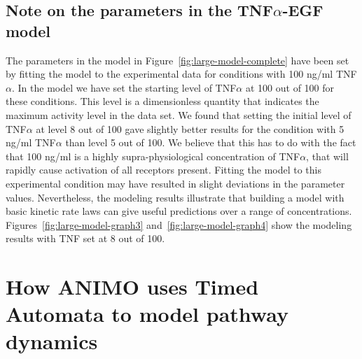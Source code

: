 \subsection{Note on the parameters in the TNF$\alpha$-EGF model}\label{suppl:parameters-tnf-egf}
The parameters in the model in Figure~\ref{fig:large-model-complete}
have been set by fitting the model to the experimental data for conditions with 100 ng/ml TNF$\alpha$.
In the model we have set the starting level of TNF$\alpha$ at 100 out of 100 for these conditions.
This level is a dimensionless quantity that indicates the maximum activity level in the data set.
We found that setting the initial level of TNF$\alpha$ at level 8 out of 100 gave slightly better results for the
condition with 5 ng/ml TNF$\alpha$ than level 5 out of 100. We believe that this has to do with the fact that
100 ng/ml is a highly supra-physiological concentration of TNF$\alpha$, that will rapidly cause activation of all
receptors present. Fitting the model to this experimental condition may have resulted in slight deviations
in the parameter values. Nevertheless, the modeling results illustrate that building a model with basic
kinetic rate laws can give useful predictions over a range of concentrations. Figures~\ref{fig:large-model-graph3} and~\ref{fig:large-model-graph4}
show the modeling results with TNF set at 8 out of 100.

\clearpage
\section{How ANIMO uses Timed Automata to model pathway dynamics}\label{suppl-sec:animo-ta}





